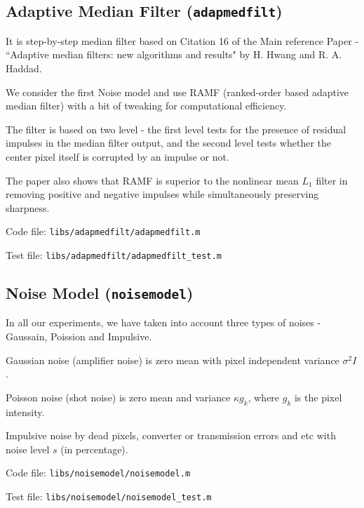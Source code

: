 \documentclass[fleqn, 11pt]{article}
\begin{document}
\subsection*{Adaptive Median Filter (\texttt{adapmedfilt})}

It is step-by-step median filter based on Citation 16 of the Main reference Paper - ``Adaptive median filters: new algorithms and results" by H. Hwang and R. A. Haddad.

\medskip

We consider the first Noise model and use RAMF (ranked-order based adaptive median filter) with a bit of tweaking for computational efficiency.

The filter is based on two level - the first level tests for the presence of residual impulses in the median filter output, and the second level tests whether the center pixel itself is corrupted by an impulse or not.

\medskip

The paper also shows that RAMF is superior to the nonlinear mean $L_1$ filter in removing positive and negative impulses while simultaneously preserving sharpness.

\medskip

Code file: \texttt{libs/adapmedfilt/adapmedfilt.m}

Test file: \texttt{libs/adapmedfilt/adapmedfilt\_test.m}

\bigskip

\subsection*{Noise Model (\texttt{noisemodel})}

In all our experiments, we have taken into account three types of noises - Gaussain, Poission and Impulsive.

\medskip

Gaussian noise (amplifier noise) is zero mean with pixel independent variance $\sigma^2 I$.

Poisson noise (shot noise) is zero mean and variance $\kappa g_k$, where $g_k$ is the pixel intensity.

Impulsive noise by dead pixels, converter or transmission errors and etc with noise level $s$ (in percentage).

\medskip

Code file: \texttt{libs/noisemodel/noisemodel.m}

Test file: \texttt{libs/noisemodel/noisemodel\_test.m}
\end{document}
